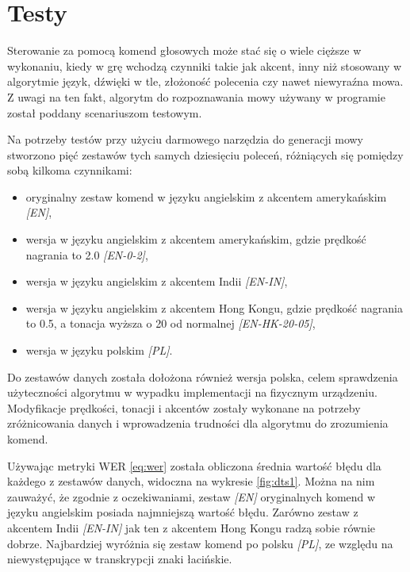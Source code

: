 \chapter{Testy}
\label{cha:testy}

Sterowanie za pomocą komend głosowych może stać się o wiele cięższe w wykonaniu, kiedy w grę wchodzą czynniki takie jak akcent, inny niż stosowany w algorytmie język, dźwięki w tle, złożoność polecenia czy nawet niewyraźna mowa. Z uwagi na ten fakt, algorytm do rozpoznawania mowy używany w programie został poddany scenariuszom testowym. 

Na potrzeby testów przy użyciu darmowego narzędzia do generacji mowy \cite{conv} stworzono pięć zestawów tych samych dziesięciu poleceń, różniących się pomiędzy sobą kilkoma czynnikami:
\begin{itemize}
    \item oryginalny zestaw komend w języku angielskim z akcentem amerykańskim \textit{[EN]},
    \item wersja w języku angielskim z akcentem amerykańskim, gdzie prędkość nagrania to 2.0 \textit{[EN-0-2]},
    \item wersja w języku angielskim z akcentem Indii \textit{[EN-IN]},
    \item wersja w języku angielskim z akcentem Hong Kongu, gdzie prędkość nagrania to 0.5, a tonacja wyższa o 20 od normalnej \textit{[EN-HK-20-05]},
    \item wersja w języku polskim \textit{[PL]}.
\end{itemize}

Do zestawów danych została dołożona również wersja polska, celem sprawdzenia użyteczności algorytmu w wypadku implementacji na fizycznym urządzeniu. Modyfikacje prędkości, tonacji i akcentów zostały wykonane na potrzeby zróżnicowania danych i wprowadzenia trudności dla algorytmu do zrozumienia komend. 

Używając metryki WER \ref{eq:wer} została obliczona średnia wartość błędu dla każdego z zestawów danych, widoczna na wykresie \ref{fig:dts1}. Można na nim zauważyć, że zgodnie z oczekiwaniami, zestaw \textit{[EN]} oryginalnych komend w języku angielskim posiada najmniejszą wartość błędu. Zarówno zestaw z akcentem Indii \textit{[EN-IN]} jak ten z akcentem Hong Kongu radzą sobie równie dobrze. Najbardziej wyróżnia się zestaw komend po polsku \textit{[PL]}, ze względu na niewystępujące w transkrypcji znaki łacińskie.

